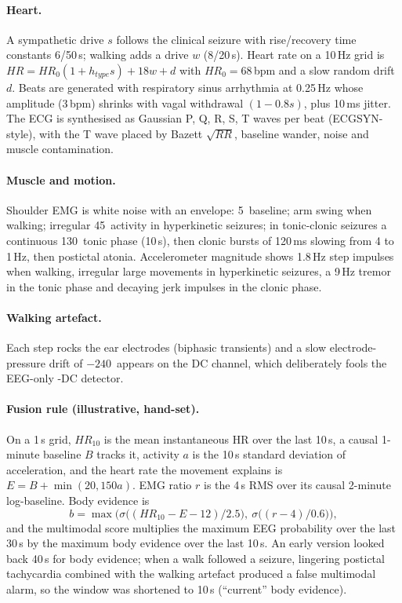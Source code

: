 \paragraph{Heart.} A sympathetic drive $s$ follows the clinical seizure with rise/recovery time constants 6/50\,s; walking adds a drive $w$ (8/20\,s). Heart rate on a 10\,Hz grid is $HR = HR_0(1+h_{type}s) + 18w + d$ with $HR_0=68$\,bpm and a slow random drift $d$. Beats are generated with respiratory sinus arrhythmia at 0.25\,Hz whose amplitude (3\,bpm) shrinks with vagal withdrawal $(1-0.8s)$, plus 10\,ms jitter. The ECG is synthesised as Gaussian P, Q, R, S, T waves per beat (ECGSYN-style), with the T wave placed by Bazett $\sqrt{RR}$, baseline wander, noise and muscle contamination.

\paragraph{Muscle and motion.} Shoulder EMG is white noise with an envelope: 5\,\uV{} baseline; arm swing when walking; irregular 45\,\uV{} activity in hyperkinetic seizures; in tonic-clonic seizures a continuous 130\,\uV{} tonic phase (10\,s), then clonic bursts of 120\,ms slowing from 4 to 1\,Hz, then postictal atonia. Accelerometer magnitude shows 1.8\,Hz step impulses when walking, irregular large movements in hyperkinetic seizures, a 9\,Hz tremor in the tonic phase and decaying jerk impulses in the clonic phase.

\paragraph{Walking artefact.} Each step rocks the ear electrodes (biphasic transients) and a slow electrode-pressure drift of $-240$\,\uV{} appears on the DC channel, which deliberately fools the EEG-only \Kp-DC detector.

\paragraph{Fusion rule (illustrative, hand-set).} On a 1\,s grid, $HR_{10}$ is the mean instantaneous HR over the last 10\,s, a causal 1-minute baseline $B$ tracks it, activity $a$ is the 10\,s standard deviation of acceleration, and the heart rate the movement explains is $E = B + \min(20, 150a)$. EMG ratio $r$ is the 4\,s RMS over its causal 2-minute log-baseline. Body evidence is
\begin{equation}
b = \max\!\Big(\sigma\big((HR_{10}-E-12)/2.5\big),\ \sigma\big((r-4)/0.6\big)\Big),
\end{equation}
and the multimodal score multiplies the maximum EEG probability over the last 30\,s by the maximum body evidence over the last 10\,s. An early version looked back 40\,s for body evidence; when a walk followed a seizure, lingering postictal tachycardia combined with the walking artefact produced a false multimodal alarm, so the window was shortened to 10\,s (``current'' body evidence).

